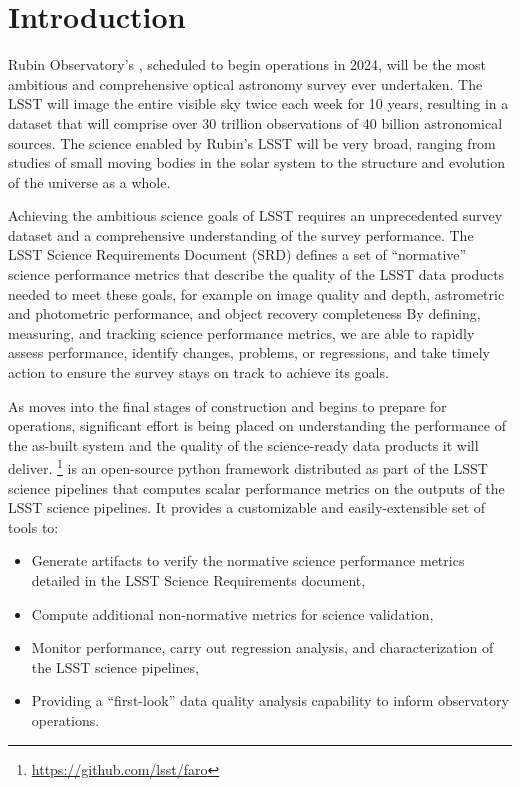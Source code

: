 \section{Introduction} \label{sec:intro}

Rubin Observatory's \lsst, scheduled to begin operations in 2024, will be the most ambitious and comprehensive optical astronomy survey ever undertaken\cite{2019ApJ...873..111I}.
The LSST will image the entire visible sky twice each week for 10 years, resulting in a dataset that will comprise over 30 trillion observations of 40 billion astronomical sources.
The science enabled by Rubin's LSST will be very broad, ranging from studies of small moving bodies in the solar system to the structure and evolution of the universe as a whole. 

Achieving the ambitious science goals of LSST requires an unprecedented survey dataset and a comprehensive understanding of the survey performance. 
The LSST Science Requirements Document (SRD)\cite{LPM-17} defines a set of ``normative'' science performance metrics that describe the quality of the LSST data products needed to meet these goals, for example on image quality and depth, astrometric and photometric performance, and object
recovery completeness
By defining, measuring, and tracking science performance metrics, we are able to rapidly assess performance, identify changes, problems, or regressions, and take timely action to ensure the survey stays on track to achieve its goals.

As \ro moves into the final stages of construction and begins to prepare for operations, significant effort is being placed on understanding the performance of the as-built system and the quality of the science-ready data products it will deliver.
\faro\footnote{\url{https://github.com/lsst/faro}} is an open-source python framework distributed as part of the LSST science pipelines\cite{2019ASPC..523..521B,2018PASJ...70S...5B} that computes scalar performance metrics on the outputs of the LSST science pipelines.
It provides a customizable and easily-extensible set of tools to:
\begin{itemize}
\item Generate artifacts to verify the normative science performance metrics detailed in the LSST Science Requirements document,
\item Compute additional non-normative metrics for science validation, 
\item Monitor performance, carry out regression analysis, and characterization of the LSST science pipelines, 
\item Providing a ``first-look'' data quality analysis capability to inform observatory operations.
\end{itemize}

